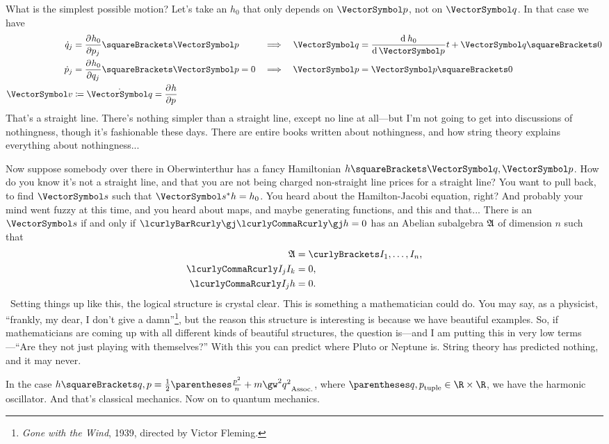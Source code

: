 \documentclass[10pt, a4paper, twoside]{lecturenotes}
\begin{document}
\begin{lecture}[date=2013-04-11]
What is the simplest possible motion? Let's take an $h_0$ that only depends on $\vp$, not on $\vq$. In that case we have
\begin{alignat*}{3}
\TimeDerivative q_j &= \pderiv{p_j}{h_0}\of\vp &\Implies&& \vq &= \deriv{\vp}{h_0}t + \vq\of{0} \\
\TimeDerivative p_j &= \pderiv{q_j}{h_0}\of\vp = 0 &\Implies && \vp &= \vp\of{0} \\
\vv &\DefineAs \TimeDerivative \vq = \pderiv p h
\end{alignat*}
That's a straight line. There's nothing simpler than a straight line, except no line at all---but I'm not going to get into discussions of nothingness, though it's fashionable these days. There are entire books written about nothingness, and how string theory explains everything about nothingness...

Now suppose somebody over there in Oberwinterthur has a fancy Hamiltonian $h\of{\vq,\vp}$. How do you know it's not a straight line, and that you are not being charged non-straight line prices for a straight line? You want to pull back, to find $\vs$ such that $\Pullback \vs h = h_0$. You heard about the Hamilton-Jacobi equation, right? And probably your mind went fuzzy at this time, and you heard about maps, and maybe generating functions, and this and that... 
There is an $\vs$ if and only if $\setst{\gj}{\Poisson\gj h = 0}$ has an Abelian subalgebra $\mathfrak{A}$ of dimension $n$ such that
\begin{align*}
\LieAlgebraSymbol A &= \set{I_1,\dotsc,I_n}\text, \\
\Poisson{I_j}{I_k}&= 0\text,\\
\Poisson{I_j}{h}&=0\text.
\end{align*}
\
Setting things up like this, the logical structure is crystal clear. This is something a mathematician could do. You may say, as a physicist, ``frankly, my dear, I don't give a damn''\footnote{\emph{Gone with the Wind}, 1939, directed by Victor Fleming.}, but the reason this structure is interesting is because we have beautiful examples. So, if mathematicians are coming up with all different kinds of beautiful structures, the question is---and I am putting this in very low terms---``Are they not just playing with themselves?'' With this you can predict where Pluto or Neptune is. String theory has predicted nothing, and it may never.

In the case $h\of{q,p}=\frac{1}{2}\pa{\frac{p^2}{n} + m\gw^2 q^2}$, where $\tuple{q,p}\in\R\Cartesian\R$, we have the harmonic oscillator.
And that's classical mechanics. Now on to quantum mechanics.


\end{lecture}
\end{document}
